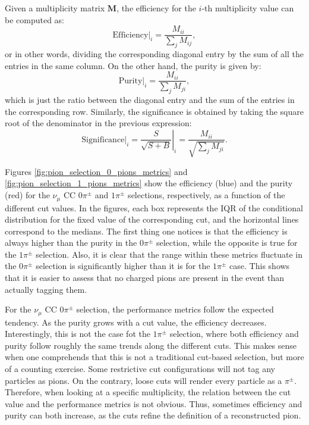Given a multiplicity matrix $\mathbf{M}$, the efficiency for the $i$-th multiplicity value can be computed as:
\begin{equation}\label{eq:efficiency_matrix}
    \left.\mathrm{Efficiency}\right|_{i} = \frac{M_{ii}}{\sum_{j} M_{ij}},
\end{equation}
or in other words, dividing the corresponding diagonal entry by the sum of all the entries in the same column. On the other hand, the purity is given by:
\begin{equation}\label{eq:purity_matrix}
    \left.\mathrm{Purity}\right|_{i} = \frac{M_{ii}}{\sum_{j} M_{ji}},
\end{equation}
which is just the ratio between the diagonal entry and the sum of the entries in the corresponding row. Similarly, the significance is obtained by taking the square root of the denominator in the previous expression:
\begin{equation}\label{eq:significance_matrix}
    \left.\mathrm{Significance}\right|_{i} = \left.\frac{S}{\sqrt{S+B}}\right|_{i} = \frac{M_{ii}}{\sqrt{\sum_{j} M_{ji}}}.
\end{equation}

Figures \ref{fig:pion_selection_0_pions_metrics} and \ref{fig:pion_selection_1_pions_metrics} show the efficiency (blue) and the purity (red) for the $\nu_{\mu}$ CC $0\pi^{\pm}$ and $1\pi^{\pm}$ selections, respectively, as a function of the different cut values. In the figures, each box represents the IQR of the conditional distribution for the fixed value of the corresponding cut, and the horizontal lines correspond to the medians. The first thing one notices is that the efficiency is always higher than the purity in the $0\pi^{\pm}$ selection, while the opposite is true for the $1\pi^{\pm}$ selection. Also, it is clear that the range within these metrics fluctuate in the $0\pi^{\pm}$ selection is significantly higher than it is for the $1\pi^{\pm}$ case. This shows that it is easier to assess that no charged pions are present in the event than actually tagging them.

For the $\nu_{\mu}$ CC $0\pi^{\pm}$ selection, the performance metrics follow the expected tendency. As the purity grows with a cut value, the efficiency decreases. Interestingly, this is not the case fot the $1\pi^{\pm}$ selection, where both efficiency and purity follow roughly the same trends along the different cuts. This makes sense when one comprehends that this is not a traditional cut-based selection, but more of a counting exercise. Some restrictive cut configurations will not tag any particles as pions. On the contrary, loose cuts will render every particle as a $\pi^{\pm}$. Therefore, when looking at a specific multiplicity, the relation between the cut value and the performance metrics is not obvious. Thus, sometimes efficiency and purity can both increase, as the cuts refine the definition of a reconstructed pion.

